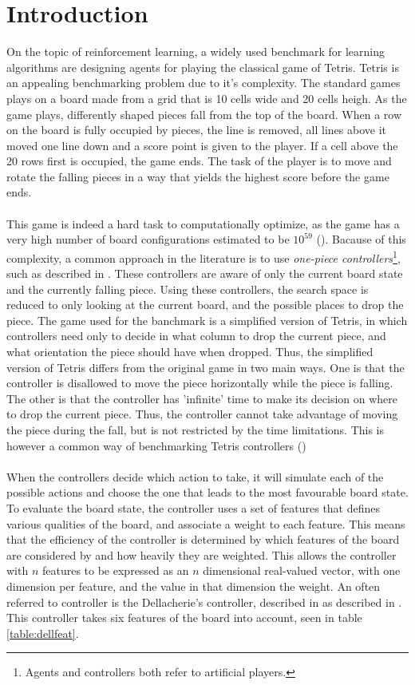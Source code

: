 \section{Introduction \label{sec:intro}}

On the topic of reinforcement learning, a widely used benchmark
for learning algorithms are designing agents 
for playing the classical game of Tetris. Tetris is an 
appealing benchmarking problem due to it's complexity. The 
standard games plays on a board made from a grid that is
10 cells wide and 20 cells heigh. As the game plays, differently
shaped pieces fall from the top of the board. 
When a row on the board is fully occupied by pieces, the line
is removed, all lines above it moved one line down and a score
point is given to the player. If a cell above the 20 rows first is
occupied, the game ends. The task of the player is to move
and rotate the falling pieces in a way that yields the highest 
score before the game ends.\\
\\
This game is indeed a hard task to computationally optimize, as
the game has a very high number of board configurations estimated to be
$10^{59}$ (\cite{scherrer2009}). Bacause of this
complexity, a common approach 
in the literature is to use 
\textit{one-piece controllers}\footnote{Agents and controllers
both refer to artificial players.}, such as described in 
\cite{scherrer2009:b}. These controllers are aware of only 
the current board state and the currently falling piece.
Using these controllers, the search space is reduced 
to only looking at the current board, and the possible 
places to drop the piece. The 
game used for the banchmark is a simplified version of Tetris,
in which 
controllers need only to decide in what column to drop the current
piece, and what orientation the piece should have when dropped.
Thus, the simplified version of Tetris differs from the 
original game in two main ways. One is that the controller is 
disallowed to move the piece horizontally while the piece 
is falling. The other is that the controller has 'infinite'
time to make its decision on where to drop the current piece.
Thus, the controller cannot take advantage of moving the piece 
during the fall, but is not restricted by the time limitations.
This is however a common way of benchmarking Tetris controllers 
(\citep{scherrer2009})\\
\\
When the controllers decide which action to take, it will
simulate each of the possible actions and choose the one that
leads to the most favourable board state. To evaluate the board 
state, the controller uses a set of features that defines 
various qualities of the board, and associate a weight to each 
feature. This means that the efficiency of the controller 
is determined by which features of the board are considered by
and how heavily they are weighted. This allows
the controller with $n$ features to be expressed as an 
$n$ dimensional real-valued vector, with one dimension 
per feature, and the value in that dimension the weight.
An often referred to controller is the Dellacherie's controller,
described in as described in \cite{scherrer2009}. This controller
takes six features of the board into account, seen in table 
\ref{table:dellfeat}.

